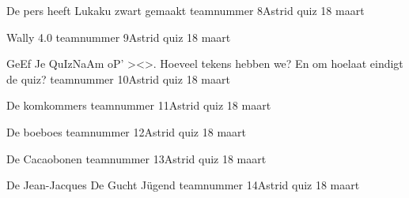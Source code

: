 \documentclass{exam}
\begin{document}
\begin{landscape}
\newpage

\vspace*{\fill}
\centering\LARGE{De pers heeft Lukaku zwart gemaakt
\linebreak
teamnummer 8\linebreak Astrid quiz 18 maart}
\vspace*{\fill}


\newpage

\vspace*{\fill}
\centering\LARGE{Wally 4.0
\linebreak
teamnummer 9\linebreak Astrid quiz 18 maart}
\vspace*{\fill}


\newpage

\vspace*{\fill}
\centering\LARGE{GeEf Je QuIzNaAm oP' ><>. Hoeveel tekens hebben we? En om hoelaat eindigt de quiz?
\linebreak
teamnummer 10\linebreak Astrid quiz 18 maart}
\vspace*{\fill}



\newpage

\vspace*{\fill}
\centering\LARGE{De komkommers\linebreak
teamnummer 11\linebreak Astrid quiz 18 maart}
\vspace*{\fill}



\newpage

\vspace*{\fill}
\centering\LARGE{De boeboes\linebreak
teamnummer 12\linebreak Astrid quiz 18 maart}
\vspace*{\fill}



\newpage

\vspace*{\fill}
\centering\LARGE{De Cacaobonen\linebreak
teamnummer 13\linebreak Astrid quiz 18 maart}
\vspace*{\fill}



\newpage

\vspace*{\fill}
\centering\LARGE{De Jean-Jacques De Gucht Jügend\linebreak
teamnummer 14\linebreak Astrid quiz 18 maart}
\vspace*{\fill}




\end{landscape}
\end{document}
